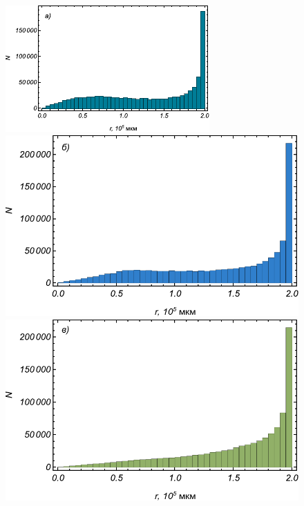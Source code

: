 \documentclass[
11pt,
master, %
subf, %
href, %
colorlinks=true, %
]{disser}
\begin{document}
\begin{figure}[htbp]
	\begin{minipage}[h]{0.45\linewidth}
		\centering
		\includegraphics[width=1\linewidth]{hist_h2=0dot5}
	\end{minipage}
	\hfill
	\begin{minipage}[h]{0.45\linewidth}
		\centering
		\includegraphics[width=1\linewidth]{hist_h2=1}
	\end{minipage}
	\vfill
	\begin{minipage}[h]{0.45\linewidth}
		\centering
		\includegraphics[width=1\linewidth]{hist_h2=2}

\end{minipage}
\end{figure}
\end{document}
